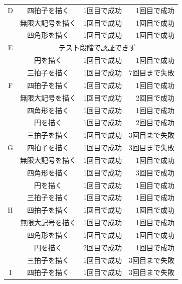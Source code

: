 \documentclass[11pt]{jreport}
\begin{document}
\begin{center}
\begin{longtable}{|c|c|r|r|}
                D & 四拍子を描く & 1回目で成功 & 1回目で成功 \\ \cline{2-4}
                  & 無限大記号を描く & 1回目で成功 & 1回目で成功 \\ \cline{2-4}
                  & 四角形を描く & 1回目で成功 & 1回目で成功 \\ \hline %
                E & \multicolumn{3}{|c|}{テスト段階で認証できず} \\ \hline
                  & 円を描く & 1回目で成功 & 1回目で成功 \\ \cline{2-4} %
                  & 三拍子を描く & 1回目で成功 & 7回目まで失敗 \\ \cline{2-4}
                F & 四拍子を描く & 1回目で成功 & 1回目で成功 \\ \cline{2-4}
                  & 無限大記号を描く & 1回目で成功 & 2回目で成功 \\ \cline{2-4}
                  & 四角形を描く & 1回目で成功 & 1回目で成功 \\ \hline %
                  & 円を描く & 1回目で成功 & 2回目で成功 \\ \cline{2-4} %
                  & 三拍子を描く & 1回目で成功 & 3回目まで失敗 \\ \cline{2-4}
                G & 四拍子を描く & 1回目で成功 & 3回目まで失敗 \\ \cline{2-4}
                  & 無限大記号を描く & 1回目で成功 & 1回目で成功 \\ \cline{2-4}
                  & 四角形を描く & 1回目で成功 & 3回目で成功 \\ \hline %
                  & 円を描く & 1回目で成功 & 1回目で成功 \\ \cline{2-4} %
                  & 三拍子を描く & 1回目で成功 & 1回目で成功 \\ \cline{2-4}
                H & 四拍子を描く & 1回目で成功 & 1回目で成功 \\ \cline{2-4}
                  & 無限大記号を描く & 1回目で成功 & 1回目で成功 \\ \cline{2-4}
                  & 四角形を描く & 1回目で成功 & 1回目で成功 \\ \hline %
                  & 円を描く & 2回目で成功 & 1回目で成功 \\ \cline{2-4} %
                  & 三拍子を描く & 1回目で成功 & 3回目まで失敗 \\ \cline{2-4}
                I & 四拍子を描く & 1回目で成功 & 3回目まで失敗 \\ \cline{2-4}

\end{longtable}
\end{center}
\end{document}

